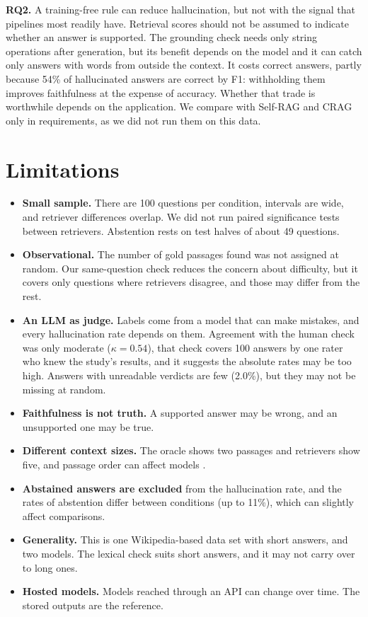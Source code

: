 \documentclass[10pt,a4paper,twocolumn]{article}
\begin{document}
\textbf{RQ2.} A training-free rule can reduce hallucination, but not with the signal that pipelines most readily have. Retrieval scores should not be assumed to indicate whether an answer is supported.
The grounding check needs only string operations after generation, but its benefit depends on the model and it can catch only answers with words from outside the context. It costs correct answers, partly because
54\% of hallucinated answers are correct by F1: withholding them improves faithfulness at the expense of accuracy. Whether that trade is worthwhile depends on the application. We compare with Self-RAG and CRAG only in requirements, as we did not run them on this data.

\section{Limitations}
\begin{itemize}\setlength\itemsep{1pt}
\item \textbf{Small sample.} There are 100 questions per condition, intervals are wide, and retriever differences overlap. We did not run paired significance tests between retrievers. Abstention rests on test halves of about 49 questions.
\item \textbf{Observational.} The number of gold passages found was not assigned at random. Our same-question check reduces the concern about difficulty, but it covers only questions where retrievers disagree, and those may differ from the rest.
\item \textbf{An LLM as judge.} Labels come from a model that can make mistakes, and every hallucination rate depends on them. Agreement with the human check was only moderate ($\kappa=0.54$), that check covers 100 answers by one rater who knew the study's results, and it suggests the absolute rates may be too high. Answers with unreadable verdicts are few (2.0\%), but they may not be missing at random.
\item \textbf{Faithfulness is not truth.} A supported answer may be wrong, and an unsupported one may be true.
\item \textbf{Different context sizes.} The oracle shows two passages and retrievers show five, and passage order can affect models \cite{liu2024lost}.
\item \textbf{Abstained answers are excluded} from the hallucination rate, and the rates of abstention differ between conditions (up to 11\%), which can slightly affect comparisons.
\item \textbf{Generality.} This is one Wikipedia-based data set with short answers, and two models. The lexical check suits short answers, and it may not carry over to long ones.
\item \textbf{Hosted models.} Models reached through an API can change over time. The stored outputs are the reference.
\end{itemize}
\end{document}
